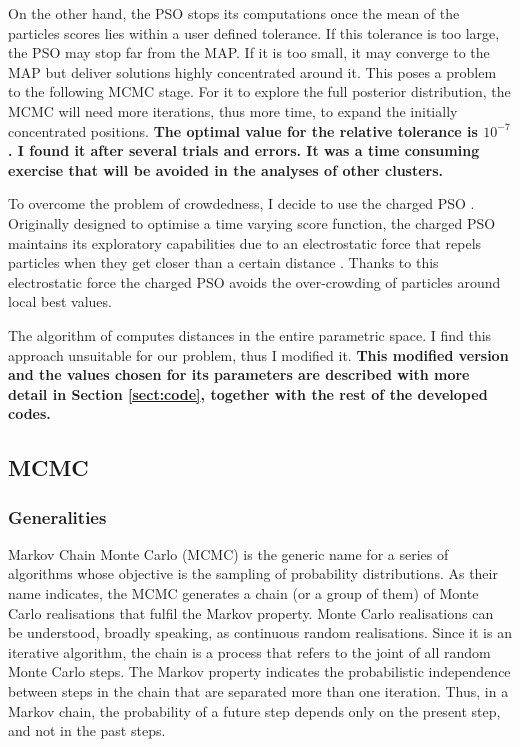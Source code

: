 On the other hand, the PSO stops its computations once the mean of the particles scores lies within a user defined tolerance. If this tolerance is too large, the PSO may stop far from the MAP. If it is too small, it may converge to the MAP but deliver solutions highly concentrated around it. This poses a problem to the following MCMC stage. For it to explore the full posterior distribution, the MCMC will need more iterations, thus more time, to expand the initially concentrated positions. \textbf{The optimal value for the relative tolerance is $10^{-7}$. I found it after several trials and errors. It was a time consuming exercise that will be avoided in the analyses of other clusters.} 

To overcome the problem of crowdedness, I decide to use the charged PSO \citep{Blackwell2002}. Originally designed to optimise a time varying score function, the charged PSO maintains its exploratory capabilities due to an electrostatic force that repels particles when they get closer than a certain distance \citep{Blackwell2002}. Thanks to this electrostatic force the charged PSO avoids the over-crowding of particles around local best values.

The algorithm of \citet{Blackwell2002} computes distances in the entire parametric space. I find this approach unsuitable for our problem, thus I modified it. \textbf{This modified version and the values chosen for its parameters are described with more detail in Section \ref{sect:code}, together with the rest of the developed codes. }

\subsection{MCMC}
\label{sect:MCMC}
\subsubsection{Generalities}
Markov Chain Monte Carlo (MCMC) is the generic name for a series of algorithms whose objective is the sampling of probability distributions. As their name indicates, the MCMC generates a chain (or a group of them) of Monte Carlo realisations that fulfil the Markov property. Monte Carlo realisations can be understood, broadly speaking, as continuous random realisations. Since it is an iterative algorithm, the chain is a process that refers to the joint of all random Monte Carlo steps. The Markov property indicates the probabilistic independence between steps in the chain that are separated more than one iteration. Thus, in a Markov chain, the probability of a future step depends only on the present step, and not in the past steps.

